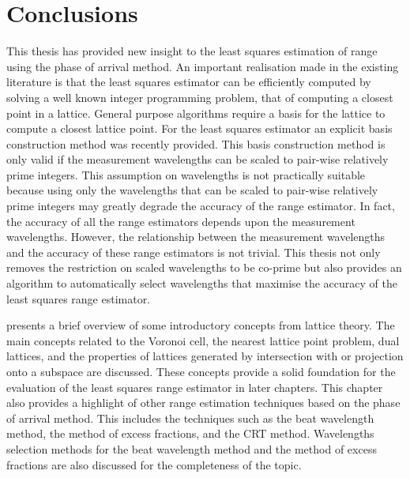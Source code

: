 \label{Chapter6}

\section{Conclusions}
This thesis has provided new insight to the least squares estimation of range using the phase of arrival method. An important realisation made in the existing literature is that the least squares estimator can be efficiently computed by solving a well known integer programming problem, that of computing a closest point in a lattice. General purpose algorithms require a basis for the lattice to compute a closest lattice point. For the least squares estimator an explicit basis construction method was recently provided. This basis construction method is only valid if the measurement wavelengths can be scaled to pair-wise relatively prime integers. This assumption on wavelengths is not practically suitable because using only the wavelengths that can be scaled to pair-wise relatively prime integers may greatly degrade the accuracy of the range estimator. In fact, the accuracy of all the range estimators depends upon the measurement wavelengths. However, the relationship between the measurement wavelengths and the accuracy of these range estimators is not trivial. This thesis not only removes the restriction on scaled wavelengths to be co-prime but also provides an algorithm to automatically select wavelengths that maximise the accuracy of the least squares range estimator.

%

 presents a brief overview of some introductory concepts from lattice theory. The main concepts related to the Voronoi cell, the nearest lattice point problem, dual lattices, and the properties of lattices generated by intersection with or projection onto a subspace are discussed. These concepts provide a solid foundation for the evaluation of the least squares range estimator in later chapters. This chapter also provides a highlight of other range estimation techniques based on the phase of arrival method. This includes the techniques such as the beat wavelength method, the method of excess fractions, and the CRT method. Wavelengths selection methods for the beat wavelength method and the method of excess fractions are also discussed for the completeness of the topic.

